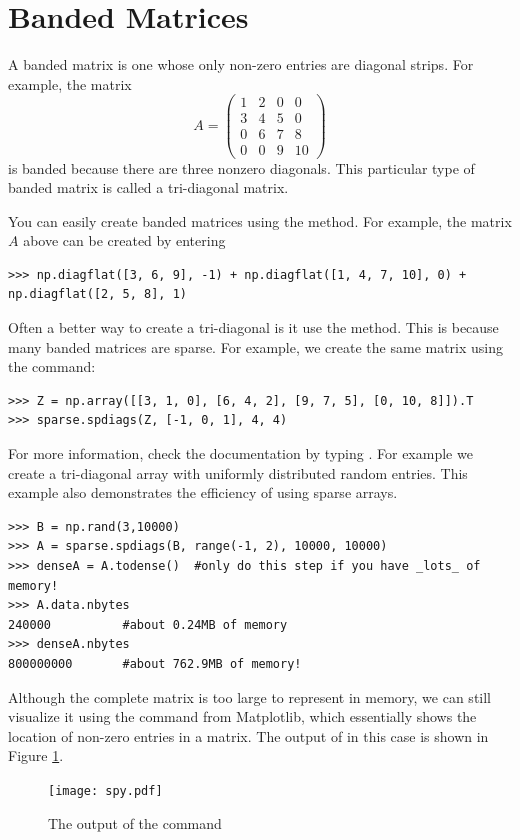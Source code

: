 \section*{Banded Matrices}
A banded matrix is one whose only non-zero entries are diagonal
strips.  For example, the matrix
\begin{equation*}
A = \begin{pmatrix}
1 & 2 & 0 & 0 \\
3 & 4 & 5 & 0 \\
0 & 6 & 7 & 8 \\
0 & 0 & 9 & 10
\end{pmatrix}
\end{equation*}
is banded because there are three nonzero diagonals.  This
particular type of banded matrix is called a tri-diagonal matrix.

You can easily create banded matrices using the  method.
For example, the matrix $A$ above can be created by entering
\begin{lstlisting}
>>> np.diagflat([3, 6, 9], -1) + np.diagflat([1, 4, 7, 10], 0) + np.diagflat([2, 5, 8], 1)
\end{lstlisting}

Often a better way to create a tri-diagonal is it use the  method.
This is because many banded matrices are sparse.
For example, we create the same matrix using the command:
\begin{lstlisting}
>>> Z = np.array([[3, 1, 0], [6, 4, 2], [9, 7, 5], [0, 10, 8]]).T
>>> sparse.spdiags(Z, [-1, 0, 1], 4, 4)
\end{lstlisting}

For more information, check the documentation by typing .
For example we create a tri-diagonal array with uniformly distributed random entries.
This example also demonstrates the efficiency of using sparse arrays.
\begin{lstlisting}
>>> B = np.rand(3,10000)
>>> A = sparse.spdiags(B, range(-1, 2), 10000, 10000)
>>> denseA = A.todense()  #only do this step if you have _lots_ of memory!
>>> A.data.nbytes
240000          #about 0.24MB of memory
>>> denseA.nbytes
800000000       #about 762.9MB of memory!
\end{lstlisting}
Although the complete matrix is too large to represent in memory,
we can still visualize it using the  command from Matplotlib,
which essentially shows the location of non-zero entries in a matrix.
The output of  in this case is shown in Figure \ref{fig:mpl_spy}.
\begin{figure}[h]
\centering
\texttt{[image: spy.pdf]}
\caption{The output of the  command}
\label{fig:mpl_spy}
\end{figure}

